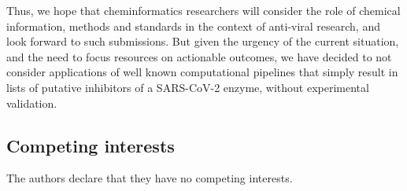 \documentclass{bmcart}
\begin{document}
Thus, we hope that cheminformatics researchers will consider the role
of chemical information, methods and standards in the context of
anti-viral research, and look forward to such submissions. But given
the urgency of the current situation, and the need to focus resources
on actionable outcomes, we have decided to not consider applications
of well known computational pipelines that simply result in lists of
putative inhibitors of a SARS-CoV-2 enzyme, without experimental
validation.



\begin{backmatter}

\section*{Competing interests}
  The authors declare that they have no competing interests.










\end{backmatter}
\end{document}

